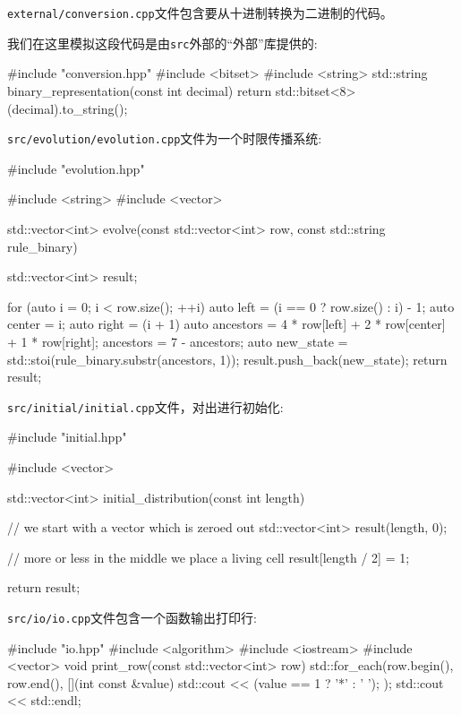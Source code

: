\texttt{external/conversion.cpp}文件包含要从十进制转换为二进制的代码。

我们在这里模拟这段代码是由\texttt{src}外部的“外部”库提供的:

\begin{codebox}[cmake]
#include "conversion.hpp"
#include <bitset>
#include <string>
std::string binary_representation(const int decimal) {
    return std::bitset<8>(decimal).to_string();
}
\end{codebox}

\texttt{src/evolution/evolution.cpp}文件为一个时限传播系统:

\begin{codebox}[cpp]
#include "evolution.hpp"

#include <string>
#include <vector>

std::vector<int> evolve(const std::vector<int> row, const std::string rule_binary) {
  std::vector<int> result;

  for (auto i = 0; i < row.size(); ++i) {
    auto left = (i == 0 ? row.size() : i) - 1;
    auto center = i;
    auto right = (i + 1) %
    auto ancestors = 4 * row[left] + 2 * row[center] + 1 * row[right];
    ancestors = 7 - ancestors;
    auto new_state = std::stoi(rule_binary.substr(ancestors, 1));
    result.push_back(new_state);
  }
  return result;
}
\end{codebox}

\texttt{src/initial/initial.cpp}文件，对出进行初始化:

\begin{codebox}[cmake]
#include "initial.hpp"

#include <vector>

std::vector<int> initial_distribution(const int length) {

  // we start with a vector which is zeroed out
  std::vector<int> result(length, 0);
  
  // more or less in the middle we place a living cell
  result[length / 2] = 1;
  
  return result;
}
\end{codebox}

\texttt{src/io/io.cpp}文件包含一个函数输出打印行:

\begin{codebox}[cpp]
#include "io.hpp"
#include <algorithm>
#include <iostream>
#include <vector>
void print_row(const std::vector<int> row) {
  std::for_each(row.begin(), row.end(), [](int const &value) {
    std::cout << (value == 1 ? '*' : ' ');
  });
  std::cout << std::endl;
}
\end{codebox}

